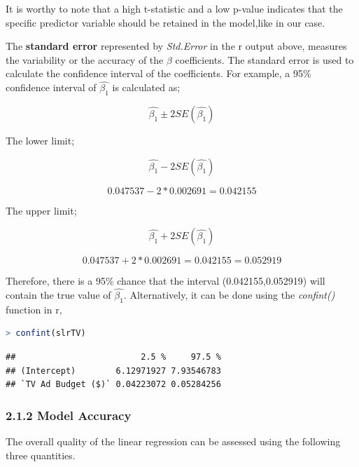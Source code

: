 \documentclass[
]{article}
\begin{document}
It is worthy to note that a high t-statistic and a low p-value indicates
that the specific predictor variable should be retained in the
model,like in our case.

The \textbf{standard error} represented by \emph{Std.Error} in the r
output above, measures the variability or the accuracy of the \(\beta\)
coefficients. The standard error is used to calculate the confidence
interval of the coefficients. For example, a 95\% confidence interval of
\(\hat{\beta_1}\) is calculated as;

\[\hat{\beta_1}\pm2SE(\hat{\beta_1})\]

The lower limit;

\[\hat{\beta_1}-2SE(\hat{\beta_1})\]

\[0.047537-2* 0.002691=0.042155\]

The upper limit;

\[\hat{\beta_1}+2SE(\hat{\beta_1})\]

\[0.047537+2* 0.002691=0.042155=0.052919\]

Therefore, there is a 95\% chance that the interval (0.042155,0.052919)
will contain the true value of \(\hat{\beta_1}\). Alternatively, it can
be done using the \emph{confint()} function in r,

\begin{lstlisting}[language=R]
> confint(slrTV)
\end{lstlisting}

\begin{lstlisting}
##                         2.5 %     97.5 %
## (Intercept)        6.12971927 7.93546783
## `TV Ad Budget ($)` 0.04223072 0.05284256
\end{lstlisting}

\hypertarget{model-accuracy}{%
\subsubsection{2.1.2 Model Accuracy}\label{model-accuracy}}

The overall quality of the linear regression can be assessed using the
following three quantities.
\end{document}
